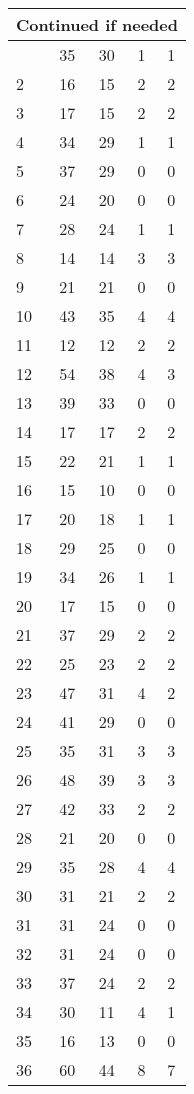 \begin{center}
\begin{longtable}{l|c|c|c|c}
\hline \multicolumn{5}{|r|}{{Continued if needed}} \\ \hline
\endfoot 
1 & 35 & 30 & 1 & 1\\ \hline
2 & 16 & 15 & 2 & 2\\ \hline
3 & 17 & 15 & 2 & 2\\ \hline
4 & 34 & 29 & 1 & 1\\ \hline
5 & 37 & 29 & 0 & 0\\ \hline
6 & 24 & 20 & 0 & 0\\ \hline
7 & 28 & 24 & 1 & 1\\ \hline
8 & 14 & 14 & 3 & 3\\ \hline
9 & 21 & 21 & 0 & 0\\ \hline
10 & 43 & 35 & 4 & 4\\ \hline
11 & 12 & 12 & 2 & 2\\ \hline
12 & 54 & 38 & 4 & 3\\ \hline
13 & 39 & 33 & 0 & 0\\ \hline
14 & 17 & 17 & 2 & 2\\ \hline
15 & 22 & 21 & 1 & 1\\ \hline
16 & 15 & 10 & 0 & 0\\ \hline
17 & 20 & 18 & 1 & 1\\ \hline
18 & 29 & 25 & 0 & 0\\ \hline
19 & 34 & 26 & 1 & 1\\ \hline
20 & 17 & 15 & 0 & 0\\ \hline
21 & 37 & 29 & 2 & 2\\ \hline
22 & 25 & 23 & 2 & 2\\ \hline
23 & 47 & 31 & 4 & 2\\ \hline
24 & 41 & 29 & 0 & 0\\ \hline
25 & 35 & 31 & 3 & 3\\ \hline
26 & 48 & 39 & 3 & 3\\ \hline
27 & 42 & 33 & 2 & 2\\ \hline
28 & 21 & 20 & 0 & 0\\ \hline
29 & 35 & 28 & 4 & 4\\ \hline
30 & 31 & 21 & 2 & 2\\ \hline
31 & 31 & 24 & 0 & 0\\ \hline
32 & 31 & 24 & 0 & 0\\ \hline
33 & 37 & 24 & 2 & 2\\ \hline
34 & 30 & 11 & 4 & 1\\ \hline
35 & 16 & 13 & 0 & 0\\ \hline
36 & 60 & 44 & 8 & 7\\ \hline

\end{longtable}
\end{center}
